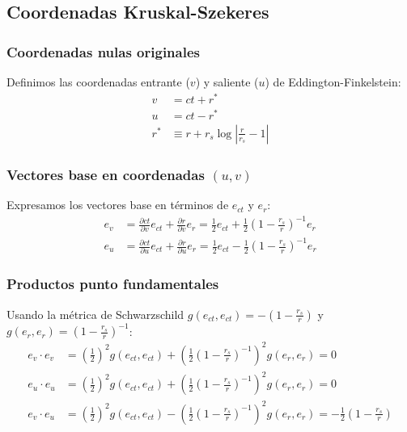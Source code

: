 \subsection{Coordenadas Kruskal-Szekeres}

\subsubsection{Coordenadas nulas originales}
\noindent Definimos las coordenadas entrante (\(v\)) y saliente (\(u\)) de Eddington-Finkelstein:
\begin{equation}
    \begin{aligned}
        v   & = ct + r^*                                      \\
        u   & = ct - r^*                                      \\
        r^* & \equiv r + r_s \log\left|\frac{r}{r_s}-1\right|
    \end{aligned}
\end{equation}

\subsubsection{Vectores base en coordenadas \( (u, v) \)}
Expresamos los vectores base en términos de \( e_{ct} \) y \( e_r \):
\begin{equation}
    \begin{aligned}
        e_v & = \frac{\partial ct}{\partial v}e_{ct} + \frac{\partial r}{\partial v}e_r = \frac{1}{2}e_{ct} + \frac{1}{2}\left(1-\frac{r_s}{r}\right)^{-1}e_r \\
        e_u & = \frac{\partial ct}{\partial u}e_{ct} + \frac{\partial r}{\partial u}e_r = \frac{1}{2}e_{ct} - \frac{1}{2}\left(1-\frac{r_s}{r}\right)^{-1}e_r
    \end{aligned}
\end{equation}

\subsubsection{Productos punto fundamentales}
Usando la métrica de Schwarzschild \( g(e_{ct},e_{ct}) = -\left(1-\frac{r_s}{r}\right) \) y \( g(e_r,e_r) = \left(1-\frac{r_s}{r}\right)^{-1} \):
\begin{equation}
    \begin{aligned}
        e_v \cdot e_v & = \left(\frac{1}{2}\right)^2 g(e_{ct},e_{ct}) + \left(\frac{1}{2}\left(1-\frac{r_s}{r}\right)^{-1}\right)^2 g(e_r,e_r) = 0                                        \\
        e_u \cdot e_u & = \left(\frac{1}{2}\right)^2 g(e_{ct},e_{ct}) + \left(\frac{1}{2}\left(1-\frac{r_s}{r}\right)^{-1}\right)^2 g(e_r,e_r) = 0                                        \\
        e_v \cdot e_u & = \left(\frac{1}{2}\right)^2 g(e_{ct},e_{ct}) - \left(\frac{1}{2}\left(1-\frac{r_s}{r}\right)^{-1}\right)^2 g(e_r,e_r) = -\frac{1}{2}\left(1-\frac{r_s}{r}\right)
    \end{aligned}
\end{equation}

